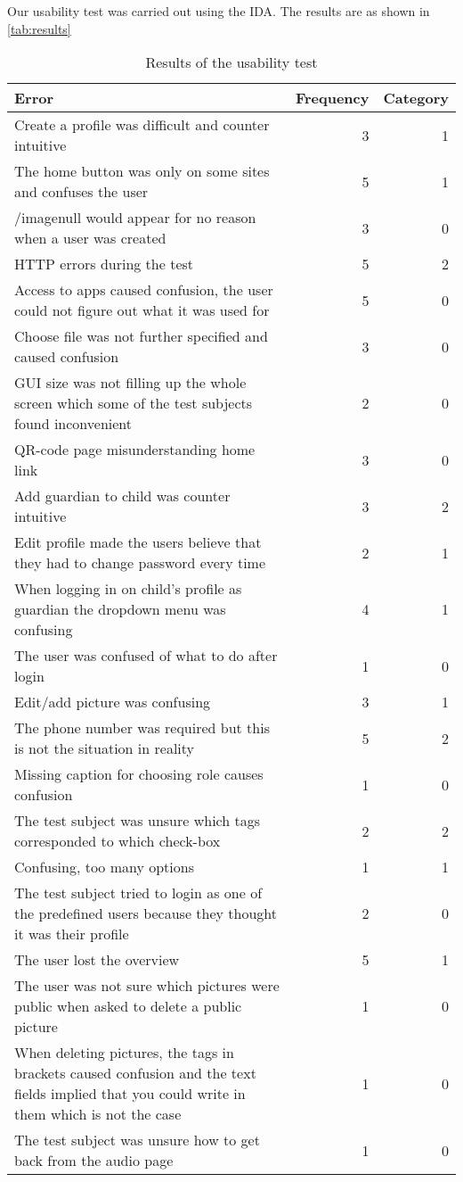 Our usability test was carried out using the IDA. The results are as shown in \autoref{tab:results}

\begin{table}[H]
	\scriptsize
	\centering
	\begin{tabular}{|p{7cm}|r|r|}
		\hline
		Error & Frequency & Category \\
		\hline
		\hline
		Create a profile was difficult and counter intuitive & 3 & 1 \\ \hline
		The home button was only on some sites and confuses the user & 5 & 1 \\ \hline
		/imagenull would appear for no reason when a user was created & 3 & 0 \\ \hline
		HTTP errors during the test & 5 & 2 \\ \hline
		Access to apps caused confusion, the user could not figure out what it was used for & 5 & 0 \\ \hline
		Choose file was not further specified and caused confusion & 3 & 0 \\ \hline
		GUI size was not filling up the whole screen which some of the test subjects found inconvenient & 2 & 0 \\ \hline
		QR-code page misunderstanding home link & 3 & 0 \\ \hline
		Add guardian to child was counter intuitive & 3 & 2 \\ \hline
		Edit profile made the users believe that they had to change password every time & 2 & 1 \\ \hline
		When logging in on child's profile as guardian the dropdown menu was confusing & 4 & 1 \\ \hline
		The user was confused of what to do after login & 1 & 0 \\ \hline
		Edit/add picture was confusing & 3 & 1 \\ \hline
		The phone number was required but this is not the situation in reality & 5 & 2 \\ \hline
		Missing caption for choosing role causes confusion & 1 & 0 \\ \hline
		The test subject was unsure which tags corresponded to which check-box & 2 & 2 \\ \hline
		Confusing, too many options & 1 & 1 \\ \hline
		The test subject tried to login as one of the predefined users because they thought it was their profile & 2 & 0 \\ \hline
		The user lost the overview & 5 & 1 \\ \hline
		The user was not sure which pictures were public when asked to delete a public picture & 1 & 0 \\ \hline
		When deleting pictures, the tags in brackets caused confusion and the text fields implied that you could write in them which is not the case & 1 & 0 \\ \hline
		The test subject was unsure how to get back from the audio page & 1 & 0 \\
		\hline
	\end{tabular}
	\caption{Results of the usability test}
	\label{tab:results}
\end{table}

